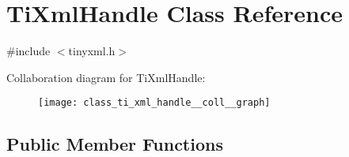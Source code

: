 \hypertarget{class_ti_xml_handle}{\section{\-Ti\-Xml\-Handle \-Class \-Reference}
\label{class_ti_xml_handle}
}


{\ttfamily \#include $<$tinyxml.\-h$>$}



\-Collaboration diagram for \-Ti\-Xml\-Handle\-:\nopagebreak
\begin{figure}[H]
\begin{center}
\leavevmode
\texttt{[image: class\_ti\_xml\_handle\_\_coll\_\_graph]}
\end{center}
\end{figure}
\subsection*{\-Public \-Member \-Functions}
